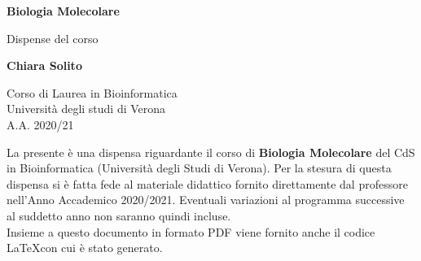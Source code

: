 \documentclass{article}
\begin{document}
\newcommand\tab[1][0.3cm]{\hspace*{#1}}


\begin{titlepage}
    \begin{center}
        \vspace*{1cm}
            
        \Huge
        \textbf{Biologia Molecolare}
            
        \vspace{0.5cm}
        \LARGE
        Dispense del corso
            
        \vspace{1.5cm}
            
        \textbf{Chiara Solito}

        \vspace{0.8cm}

            
        \Large
        Corso di Laurea in Bioinformatica\\
        Università degli studi di Verona\\
        A.A. 2020/21
            
    \end{center}
\end{titlepage}
La presente è una dispensa riguardante il corso di \textbf{Biologia Molecolare} del CdS in Bioinformatica (Università degli Studi di Verona). Per la stesura di questa dispensa si è fatta fede al materiale didattico fornito direttamente dal professore nell'Anno Accademico 2020/2021. Eventuali variazioni al programma successive al suddetto anno non saranno quindi incluse.\\
Insieme a questo documento in formato PDF viene fornito anche il codice \LaTeX  con cui è stato generato.
\tableofcontents
\thispagestyle{empty}
\newpage
\thispagestyle{empty}
\end{document}
